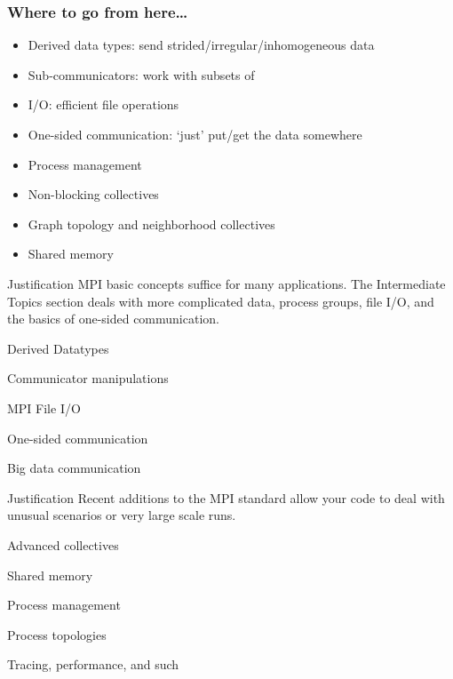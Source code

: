 \documentclass[11pt,headernav]{beamer}
\begin{document}
\begin{frame}[containsverbatim]\frametitle{Where to go from here\ldots}
  \begin{itemize}
  \item Derived data types: send strided/irregular/inhomogeneous data
  \item Sub-communicators: work with subsets of 
  \item I/O: efficient file operations
  \item One-sided communication: `just' put/get the data somewhere
  \item Process management
  \item Non-blocking collectives
  \item Graph topology and neighborhood collectives
  \item Shared memory
  \end{itemize}
\end{frame}

\renewcommand\standardversion{}


\begin{frame}{Justification}
  MPI basic concepts suffice for many applications.  The Intermediate
  Topics section deals with more complicated data, process groups,
  file I/O, and the basics of one-sided communication.
\end{frame}

 {Derived Datatypes}


 {Communicator manipulations}


 {MPI File I/O}


 {One-sided communication}
 


 {Big data communication}



\begin{frame}{Justification}
  Recent additions to the MPI standard allow your 
  code to deal with unusual scenarios or very large scale runs.
\end{frame}

 {Advanced collectives}


 {Shared memory}


 {Process management}


 {Process topologies}



 {Tracing, performance, and such}

\end{document}
